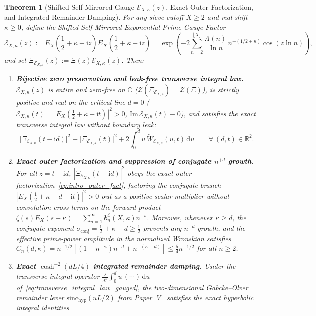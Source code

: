 \documentclass[11pt,reqno]{amsart}
\newtheorem{theorem}{Theorem}[section]
\theoremstyle{definition}
\theoremstyle{remark}
\numberwithin{equation}{section}
\newcommand{\R}{\mathbb{R}}
\newcommand{\C}{\mathbb{C}}
\newcommand{\dd}{\mathrm{d}}
\newcommand{\ii}{\mathrm{i}}
\newcommand{\Ima}{\mathrm{Im}}
\newcommand{\sinch}{\mathrm{sinc}_{\mathrm{hyp}}}
\begin{document}
\begin{theorem}[Shifted Self-Mirrored Gauge $\mathcal{E}_{X,\kappa}(z)$, Exact Outer Factorization, and Integrated Remainder Damping]\label{thm:shifted_gauge}
For any sieve cutoff $X \ge 2$ and real shift $\kappa \ge 0$, define the \emph{Shifted Self-Mirrored Exponential Prime-Gauge Factor}
\begin{equation}\label{eq:E_X_kappa_def}
\mathcal{E}_{X,\kappa}(z) := E_X\!\left(\frac{1}{2} + \kappa + \ii z\right)E_X\!\left(\frac{1}{2} + \kappa - \ii z\right) = \exp\!\left(-2\sum_{n=2}^{\lfloor X\rfloor} \frac{\Lambda(n)}{\ln n}\,n^{-(1/2+\kappa)}\cos(z\ln n)\right),
\end{equation}
and set $\Xi_{\mathcal{E}_{X,\kappa}}(z) := \Xi(z)\mathcal{E}_{X,\kappa}(z)$. Then:
\begin{enumerate}[label=\textup{(\alph*)},leftmargin=2.2em]
\item \textbf{Bijective zero preservation and leak-free transverse integral law.} $\mathcal{E}_{X,\kappa}(z)$ is entire and zero-free on $\C$ ($\mathcal{Z}(\Xi_{\mathcal{E}_{X,\kappa}}) = \mathcal{Z}(\Xi)$), is strictly positive and real on the critical line $d = 0$ ($\mathcal{E}_{X,\kappa}(t) = |E_X(\frac{1}{2}+\kappa+\ii t)|^2 > 0$, $\Ima\,\mathcal{E}_{X,\kappa}(t) \equiv 0$), and satisfies the exact transverse integral law without boundary leak:
\begin{equation}\label{eq:transverse_integral_law_gauged}
\bigl|\Xi_{\mathcal{E}_{X,\kappa}}(t - \ii d)\bigr|^2 \equiv \bigl|\Xi_{\mathcal{E}_{X,\kappa}}(t)\bigr|^2 + 2\int_0^d u\,\widetilde{W}_{\mathcal{E}_{X,\kappa}}(u,t)\,\dd u \qquad \forall\, (d,t) \in \R^2.
\end{equation}
\item \textbf{Exact outer factorization and suppression of conjugate $n^{+d}$ growth.} For all $z = t - \ii d$, $|\Xi_{\mathcal{E}_{X,\kappa}}(t-\ii d)|^2$ obeys the exact outer factorization~\eqref{eq:intro_outer_fact}, factoring the conjugate branch $|E_X(\frac{1}{2}+\kappa-d-\ii t)|^2 > 0$ out as a positive scalar multiplier without convolution cross-terms on the forward product $\zeta(s)E_X(s+\kappa) = \sum_{n=1}^{\infty} b_n^{\mathcal{E}}(X,\kappa)n^{-s}$. Moreover, whenever $\kappa \ge d$, the conjugate exponent $\sigma_{\mathrm{conj}} = \frac{1}{2} + \kappa - d \ge \frac{1}{2}$ prevents any $n^{+d}$ growth, and the effective prime-power amplitude in the normalized Wronskian satisfies $C_n(d,\kappa) = n^{-1/2}[(1-n^{-\kappa})n^{-d} + n^{-(\kappa-d)}] \le \frac{5}{4}n^{-1/2}$ for all $n \ge 2$.
\item \textbf{Exact $\cosh^{-2}(dL/4)$ integrated remainder damping.} Under the transverse integral operator $\frac{2}{d^2}\int_0^d u\,(\cdots)\,\dd u$ of~\eqref{eq:transverse_integral_law_gauged}, the two-dimensional Gabcke--Olver remainder lever $\sinch(uL/2)$ from Paper~V~\cite{missiaen2026paper5} satisfies the exact hyperbolic integral identities

\end{enumerate}
\end{theorem}
\end{document}
